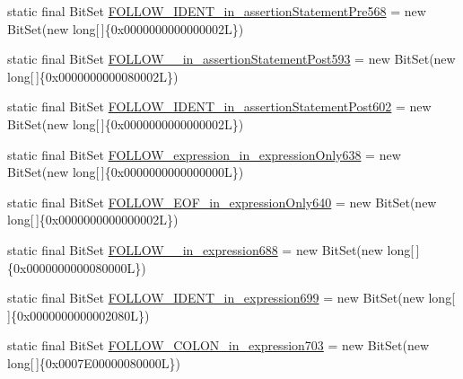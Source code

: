 \begin{DoxyCompactItemize}
\item 
static final Bit\-Set \hyperlink{classorg_1_1tzi_1_1use_1_1parser_1_1testsuite_1_1_test_suite_parser_a021fa6d49c74dc6841d832ca4b084ed9}{F\-O\-L\-L\-O\-W\-\_\-\-I\-D\-E\-N\-T\-\_\-in\-\_\-assertion\-Statement\-Pre568} = new Bit\-Set(new long\mbox{[}$\,$\mbox{]}\{0x0000000000000002\-L\})
\item 
static final Bit\-Set \hyperlink{classorg_1_1tzi_1_1use_1_1parser_1_1testsuite_1_1_test_suite_parser_aa187a18f8e5022ab4209193379e1de6b}{F\-O\-L\-L\-O\-W\-\_\-\_\-in\-\_\-assertion\-Statement\-Post593} = new Bit\-Set(new long\mbox{[}$\,$\mbox{]}\{0x0000000000080002\-L\})
\item 
static final Bit\-Set \hyperlink{classorg_1_1tzi_1_1use_1_1parser_1_1testsuite_1_1_test_suite_parser_ae121116af18bc420092b02fd2a603949}{F\-O\-L\-L\-O\-W\-\_\-\-I\-D\-E\-N\-T\-\_\-in\-\_\-assertion\-Statement\-Post602} = new Bit\-Set(new long\mbox{[}$\,$\mbox{]}\{0x0000000000000002\-L\})
\item 
static final Bit\-Set \hyperlink{classorg_1_1tzi_1_1use_1_1parser_1_1testsuite_1_1_test_suite_parser_a42aa661ce4cf88ab2a79a73b67fa0807}{F\-O\-L\-L\-O\-W\-\_\-expression\-\_\-in\-\_\-expression\-Only638} = new Bit\-Set(new long\mbox{[}$\,$\mbox{]}\{0x0000000000000000\-L\})
\item 
static final Bit\-Set \hyperlink{classorg_1_1tzi_1_1use_1_1parser_1_1testsuite_1_1_test_suite_parser_a6329590ba95f850a5c2a6912177cec37}{F\-O\-L\-L\-O\-W\-\_\-\-E\-O\-F\-\_\-in\-\_\-expression\-Only640} = new Bit\-Set(new long\mbox{[}$\,$\mbox{]}\{0x0000000000000002\-L\})
\item 
static final Bit\-Set \hyperlink{classorg_1_1tzi_1_1use_1_1parser_1_1testsuite_1_1_test_suite_parser_aba816277c2624c5dbb3f7ee37ddd95fc}{F\-O\-L\-L\-O\-W\-\_\-\_\-in\-\_\-expression688} = new Bit\-Set(new long\mbox{[}$\,$\mbox{]}\{0x0000000000080000\-L\})
\item 
static final Bit\-Set \hyperlink{classorg_1_1tzi_1_1use_1_1parser_1_1testsuite_1_1_test_suite_parser_ad346c05aac097dc1a9e8421387cdd1d8}{F\-O\-L\-L\-O\-W\-\_\-\-I\-D\-E\-N\-T\-\_\-in\-\_\-expression699} = new Bit\-Set(new long\mbox{[}$\,$\mbox{]}\{0x0000000000002080\-L\})
\item 
static final Bit\-Set \hyperlink{classorg_1_1tzi_1_1use_1_1parser_1_1testsuite_1_1_test_suite_parser_a9e0c321db6fb7e2e1853f52a0b5a233f}{F\-O\-L\-L\-O\-W\-\_\-\-C\-O\-L\-O\-N\-\_\-in\-\_\-expression703} = new Bit\-Set(new long\mbox{[}$\,$\mbox{]}\{0x0007\-E00000080000\-L\})
\item 

\end{DoxyCompactItemize}

